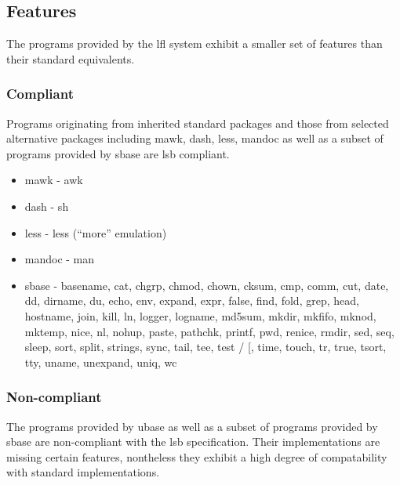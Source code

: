 \subsection{Features}\label{Features}

The programs provided by the \gls{lfl} system exhibit a smaller set of features than their standard equivalents.

\subsubsection{Compliant}

Programs originating from inherited standard packages and those from selected alternative packages including mawk, dash, less, mandoc as well as a subset of programs provided by sbase are \gls{lsb} compliant.

\begin{itemize}
    \item mawk - awk
    \item dash - sh
    \item less - less (\enquote{more} emulation)
    \item mandoc - man
    \item sbase - basename, cat, chgrp, chmod, chown, cksum, cmp, comm, cut, date, dd, dirname, du, echo, env, expand, expr, false, find, fold, grep, head, hostname, join, kill, ln, logger, logname, md5sum, mkdir, mkfifo, mknod, mktemp, nice, nl, nohup, paste, pathchk, printf, pwd, renice, rmdir, sed, seq, sleep, sort, split, strings, sync, tail, tee, test / [, time, touch, tr, true, tsort, tty, uname, unexpand, uniq, wc
\end{itemize}

\subsubsection{Non-compliant}

The programs provided by ubase as well as a subset of programs provided by sbase are non-compliant with the \gls{lsb} specification. Their implementations are missing certain features, nontheless they exhibit a high degree of compatability with standard implementations.


